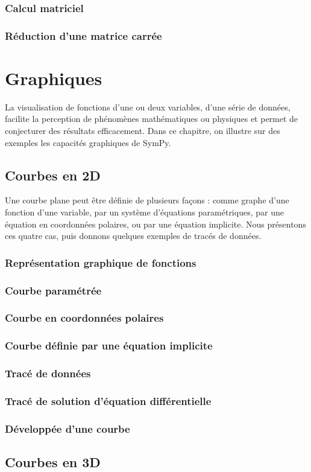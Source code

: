   \subsection{Calcul matriciel} 
  \subsection{Réduction d'une matrice carrée}
 \chapter{Graphiques}
La visualisation de fonctions d'une ou deux variables, d'une série de données, facilite la perception de phénomènes mathématiques ou physiques et permet de conjecturer des résultats efficacement. Dans ce chapitre, on illustre sur des exemples les capacités graphiques de SymPy.
 \section{Courbes en 2D}
 Une courbe plane peut être définie de plusieurs façons : comme graphe d’une fonction d’une variable, par un système d’équations paramétriques, par une équation en coordonnées polaires, ou par une équation implicite. Nous présentons
ces quatre cas, puis donnons quelques exemples de tracés de données.
 \subsection{Représentation graphique de fonctions}
 \subsection{Courbe paramétrée}
 \subsection{Courbe en coordonnées polaires}
 \subsection{Courbe définie par une équation implicite}
 \subsection{Tracé de données}
 \subsection{Tracé de solution d’équation différentielle}
 \subsection{Développée d’une courbe}
 \section{Courbes en 3D}   
  
